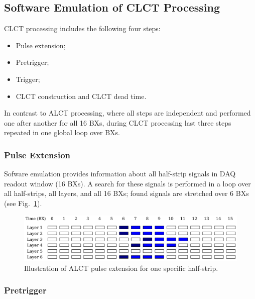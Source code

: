 \newpage
\subsection{Software Emulation of CLCT Processing}

CLCT processing includes the following four steps:

\begin{itemize}
    \item Pulse extension;
    \item Pretrigger;
    \item Trigger;
    \item CLCT construction and CLCT dead time.
\end{itemize}

In contrast to ALCT processing, where all steps are independent and performed one after another for all 16 BXs, during CLCT processing last three steps repeated in one global loop over BXs.

\subsubsection{Pulse Extension}

Sofware emulation provides information about all half-strip signals in DAQ readout window (16 BXs). A search for these signals is performed in a loop over all half-strips, all layers, and all 16 BXs; found signals are stretched over 6 BXs (see Fig.~\ref{fig:clct_pulse_extension}).

\begin{figure}[tbh]
        \begin{center}
                \includegraphics[width=0.9\linewidth]{figures/stretched_hits_clct.pdf}
                \caption{Illustration of ALCT pulse extension for one specific half-strip.}
                \label{fig:clct_pulse_extension}
        \end{center}
\end{figure}

\subsubsection{Pretrigger}

